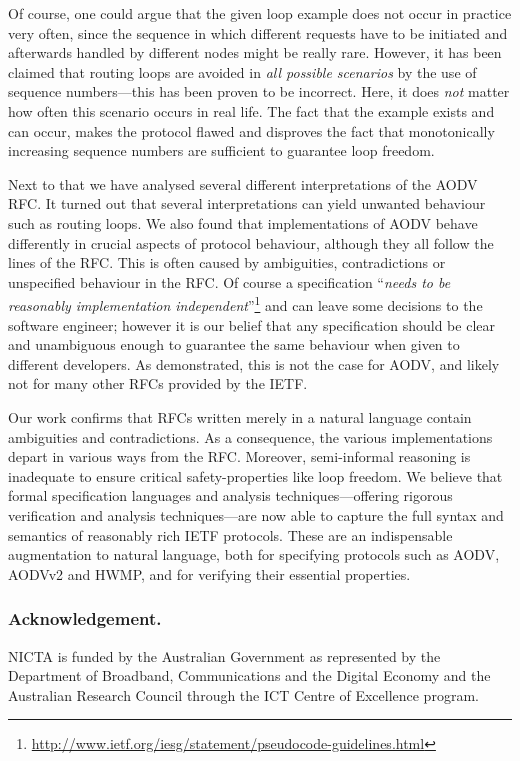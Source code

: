 \documentclass[letterpaper]{sig-alternate-pages}
\renewcommand{\sf}{\it}
\begin{document}
Of course, one could argue that the given loop example does not occur in practice very often, since the 
sequence in which different requests have to be initiated and afterwards handled by different nodes
might be really rare. However, it has been claimed that routing loops are avoided in {\em all possible scenarios} by the use of 
sequence numbers---this has been proven to be incorrect. 
Here, it does {\em not} matter how often this scenario occurs in real life. The fact that the example exists and can occur, makes the protocol flawed and disproves the  fact that monotonically increasing sequence numbers are sufficient to guarantee loop freedom.

Next to that we have analysed
several different interpretations of the AODV RFC\@. 
It turned out that
several interpretations can yield unwanted behaviour such as routing loops. 
We also found that implementations of 
AODV behave differently in crucial aspects of protocol behaviour, although they all follow the lines of the RFC\@. 
This is often caused by ambiguities, contradictions or unspecified behaviour in the RFC\@.
Of course a specification ``{\sf needs to be reasonably implementation independent\/}''\footnote{\label{foot}\url{http://www.ietf.org/iesg/statement/pseudocode-guidelines.html}}
and can leave some decisions to the software engineer; however it is our belief that any specification should be clear and 
unambiguous enough to guarantee the same behaviour when given to different developers. 
As demonstrated, this is not the case for AODV, and likely
not for many other RFCs provided by the IETF.

Our work confirms that RFCs written merely in a natural
language contain ambiguities and contradictions. As a consequence, the
various implementations
depart in various ways from the RFC\@. Moreover, semi-informal
reasoning is inadequate to ensure critical safety-properties like
loop freedom.  We believe that formal specification languages and
analysis techniques---offering rigorous verification and ana\-lysis techniques---are
now able to capture the full syntax and semantics of reasonably rich
IETF protocols. These are an indispensable augmentation to natural
language, both for specifying protocols such as AODV, AODVv2 and HWMP,
and for verifying their essential properties.

\subsubsection*{Acknowledgement.}
NICTA is funded by the Australian Government as represented by the Department of Broadband,
Communications and the Digital Economy and the Australian Research Council through the ICT Centre of
Excellence program.
\end{document}
